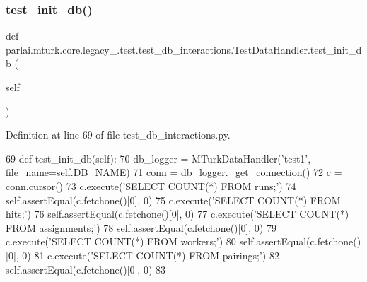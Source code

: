 \subsubsection{\texorpdfstring{test\+\_\+init\+\_\+db()}{test\_init\_db()}}
{\footnotesize\ttfamily def parlai.\+mturk.\+core.\+legacy\+\_.\+test.\+test\+\_\+db\+\_\+interactions.\+Test\+Data\+Handler.\+test\+\_\+init\+\_\+db (\begin{DoxyParamCaption}\item[{}]{self }\end{DoxyParamCaption})}



Definition at line 69 of file test\+\_\+db\+\_\+interactions.\+py.


\begin{DoxyCode}
69     \textcolor{keyword}{def }test\_init\_db(self):
70         db\_logger = MTurkDataHandler(\textcolor{stringliteral}{'test1'}, file\_name=self.DB\_NAME)
71         conn = db\_logger.\_get\_connection()
72         c = conn.cursor()
73         c.execute(\textcolor{stringliteral}{'SELECT COUNT(*) FROM runs;'})
74         self.assertEqual(c.fetchone()[0], 0)
75         c.execute(\textcolor{stringliteral}{'SELECT COUNT(*) FROM hits;'})
76         self.assertEqual(c.fetchone()[0], 0)
77         c.execute(\textcolor{stringliteral}{'SELECT COUNT(*) FROM assignments;'})
78         self.assertEqual(c.fetchone()[0], 0)
79         c.execute(\textcolor{stringliteral}{'SELECT COUNT(*) FROM workers;'})
80         self.assertEqual(c.fetchone()[0], 0)
81         c.execute(\textcolor{stringliteral}{'SELECT COUNT(*) FROM pairings;'})
82         self.assertEqual(c.fetchone()[0], 0)
83 
\end{DoxyCode}
\mbox{\label{classparlai_1_1mturk_1_1core_1_1legacy__2018_1_1test_1_1test__db__interactions_1_1TestDataHandler_a080ec5d7ca57e836021f7d7464807e26}} 
